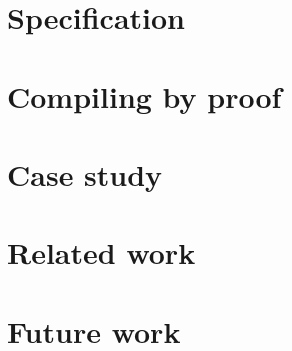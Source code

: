 \documentclass{llncs}
\begin{document}
\section{Specification}
\label{secSpecification}


\section{Compiling by proof}
\label{secCompilingByProof}


\section{Case study}
\label{secCaseStudy}


\section{Related work}
\label{secRelatedWork}



\section{Future work}
\label{secFutureWork}




\end{document}
